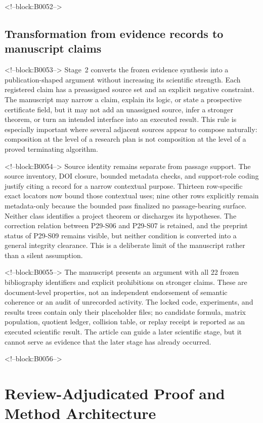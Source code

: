 \documentclass[11pt,a4paper]{article}
\begin{document}
<!--block:B0052-->
\subsection{Transformation from evidence records to manuscript claims}

<!--block:B0053-->
Stage~2 converts the frozen evidence synthesis into a publication-shaped argument without increasing its scientific strength. Each registered claim has a preassigned source set and an explicit negative constraint. The manuscript may narrow a claim, explain its logic, or state a prospective certificate field, but it may not add an unassigned source, infer a stronger theorem, or turn an intended interface into an executed result. This rule is especially important where several adjacent sources appear to compose naturally: composition at the level of a research plan is not composition at the level of a proved terminating algorithm.

<!--block:B0054-->
Source identity remains separate from passage support. The
source inventory, DOI closure, bounded metadata checks, and support-role coding
justify citing a record for a narrow contextual purpose. Thirteen row-specific exact
locators now bound those contextual uses; nine other rows explicitly remain
metadata-only because the bounded pass finalized no passage-bearing surface. Neither
class identifies a project theorem or discharges its hypotheses. The correction
relation between P29-S06 and P29-S07 is retained, and the preprint status of P29-S09
remains visible, but neither condition is converted into a general integrity
clearance. This is a deliberate limit of the manuscript rather than a silent
assumption.

<!--block:B0055-->
The manuscript presents an argument with all 22 frozen bibliography identifiers and explicit prohibitions on stronger claims. These are document-level properties, not an independent endorsement of semantic coherence or an audit of unrecorded activity. The locked code, experiments, and results trees contain only their placeholder files; no candidate formula, matrix population, quotient ledger, collision table, or replay receipt is reported as an executed scientific result. The article can guide a later scientific stage, but it cannot serve as evidence that the later stage has already occurred.

<!--block:B0056-->
\section{Review-Adjudicated Proof and Method Architecture}
\end{document}
